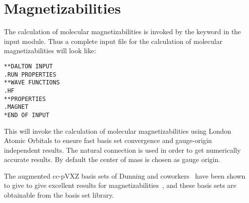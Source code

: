 \section{Magnetizabilities}\label{sec:magnetizability}

\begin{center}
\end{center}

The calculation of molecular magnetizabilities
is invoked by the 
keyword  in the  input module. Thus
a complete input file for the calculation of molecular
magnetizabilities will look like:

\begin{verbatim}
**DALTON INPUT
.RUN PROPERTIES
**WAVE FUNCTIONS
.HF
**PROPERTIES
.MAGNET
*END OF INPUT
\end{verbatim}

This will invoke the calculation of molecular magnetizabilities using
London Atomic Orbitals to ensure fast basis set
convergence and 
gauge-origin independent results. The natural
connection 
\cite{joklbkrthpjtca90} is used in order to get numerically accurate
results. By default the center of mass is chosen
as gauge origin. 

The augmented cc-pVXZ basis sets of Dunning and
coworkers~\cite{thdjcp90,rakthdrjhjcp96,dewthdjcp98,dewthdjcp100} have
been shown to give  to give excellent results for
magnetizabilities~\cite{pdkrthklbpj,krthklbpjhjajjcp99,krthpjklbcpl223,krhsthklbpjjacs116},
and these basis sets are obtainable from the basis set library.

